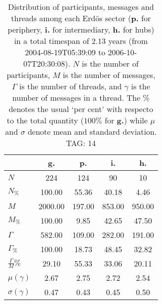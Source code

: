 \begin{table}[h!]
\begin{center}
\begin{tabular}{| l || c | c | c | c |}\hline
 & {\bf g.} & {\bf p.} & {\bf i.} & {\bf h.} \\\hline\hline
$N$ & 224  & 124  & 90  & 10 \\
$N_{\%}$ & 100.00  & 55.36  & 40.18  & 4.46 \\\hline
$M$ & 2000.00  & 197.00  & 853.00  & 950.00 \\
$M_{\%}$ & 100.00  & 9.85  & 42.65  & 47.50 \\\hline
$\Gamma$ & 582.00  & 109.00  & 282.00  & 191.00 \\
$\Gamma_{\%}$ & 100.00  & 18.73  & 48.45  & 32.82 \\\hline
$\frac{\Gamma}{M}\%$ & 29.10  & 55.33  & 33.06  & 20.11 \\
$\mu(\gamma)$ & 2.67  & 2.75  & 2.72  & 2.54 \\
$\sigma(\gamma)$ & 0.47  & 0.43  & 0.45  & 0.50 \\\hline
\end{tabular}
\caption{Distribution of participants, messages and threads among each Erd\"os sector ({\bf p.} for periphery, {\bf i.} for intermediary, 
    {\bf h.} for hubs) in a total timespan of 2.13 years (from 2004-08-19T05:39:09 to 2006-10-07T20:30:08). $N$ is the number of participants, $M$ is the number of messages, $\Gamma$ is the number of threads, and $\gamma$ is the number of messages in a thread.
    The \% denotes the usual `per cent' with respecto to the total quantity ($100\%$ for {\bf g.})
    while $\mu$ and $\sigma$ denote mean and standard deviation. TAG: 14}
\end{center}
\end{table}